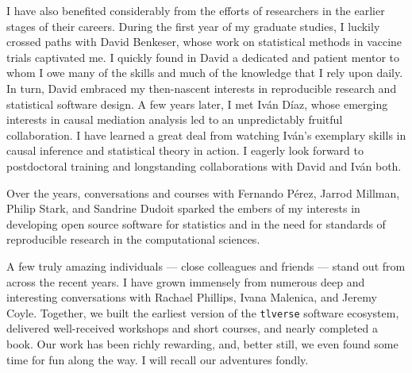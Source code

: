 \documentclass{ucbthesis}
\begin{document}
\begin{frontmatter}
\begin{acknowledgements}
I have also benefited considerably from the efforts of researchers in the
earlier stages of their careers. During the first year of my graduate studies,
I luckily crossed paths with David Benkeser, whose work on statistical methods
in vaccine trials captivated me. I quickly found in David a dedicated and
patient mentor to whom I owe many of the skills and much of the knowledge that
I rely upon daily. In turn, David embraced my then-nascent interests in
reproducible research and statistical software design.
A few years later, I met Iv\'{a}n D\'{i}az, whose emerging interests in causal
mediation analysis led to an unpredictably fruitful collaboration. I have
learned a great deal from watching Iv\'{a}n's exemplary skills in causal
inference and statistical theory in action.
I eagerly look forward to postdoctoral training and longstanding collaborations
with David and Iv\'{a}n both.

Over the years, conversations and courses with Fernando P{\'e}rez, Jarrod
Millman, Philip Stark, and Sandrine Dudoit sparked the embers of my interests in
developing open source software for statistics and in the need for standards of
reproducible research in the computational sciences.

A few truly amazing individuals --- close colleagues and friends --- stand out
from across the recent years. I have grown immensely from numerous deep and
interesting conversations with Rachael Phillips, Ivana Malenica, and Jeremy
Coyle. Together, we built the earliest version of the \texttt{tlverse} software
ecosystem, delivered well-received workshops and short courses, and nearly
completed a book. Our work has been richly rewarding, and, better still, we even
found some time for fun along the way. I will recall our adventures fondly.

\end{acknowledgements}

\end{frontmatter}

\pagestyle{headings}








\printbibliography
\end{document}

